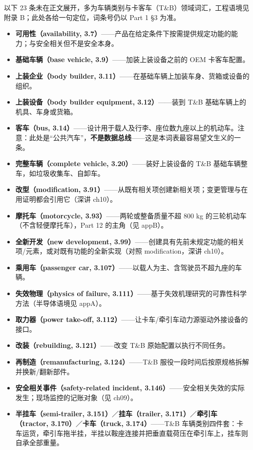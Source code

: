 以下 23 条未在正文展开，多为车辆类别与卡客车（T\&B）领域词汇，工程语境见附录 B；此处各给一句定位，词条号仍以 Part 1 §3 为准。

\begin{itemize}
\item \textbf{可用性（availability, 3.7）}——产品在给定条件下按需提供规定功能的能力；与安全相关但不是安全本身。
\item \textbf{基础车辆（base vehicle, 3.9）}——加装上装设备之前的 OEM 卡客车配置。
\item \textbf{上装企业（body builder, 3.11）}——在基础车辆上加装车身、货箱或设备的组织。
\item \textbf{上装设备（body builder equipment, 3.12）}——装到 T\&B 基础车辆上的机具、车身或货箱。
\item \textbf{客车（bus, 3.14）}——设计用于载人及行李、座位数九座以上的机动车。注意：此处是“公共汽车”，\textbf{不是数据总线}——这是本词表最容易望文生义的一条。
\item \textbf{完整车辆（complete vehicle, 3.20）}——装好上装设备的 T\&B 基础车辆整车，如垃圾收集车、自卸车。
\item \textbf{改型（modification, 3.91）}——从既有相关项创建新相关项；变更管理与在用证明都会引用它（深讲 ch10）。
\item \textbf{摩托车（motorcycle, 3.93）}——两轮或整备质量不超 800 kg 的三轮机动车（不含轻便摩托车），Part 12 的主角（见 appB）。
\item \textbf{全新开发（new development, 3.99）}——创建具有先前未规定功能的相关项/元素，或对既有功能的全新实现（对照 modification，深讲 ch10）。
\item \textbf{乘用车（passenger car, 3.107）}——以载人为主、含驾驶员不超九座的车辆。
\item \textbf{失效物理（physics of failure, 3.111）}——基于失效机理研究的可靠性科学方法（半导体语境见 appA）。
\item \textbf{取力器（power take-off, 3.112）}——让卡车/牵引车动力源驱动外接设备的接口。
\item \textbf{改装（rebuilding, 3.121）}——改变 T\&B 原始配置以执行不同任务。
\item \textbf{再制造（remanufacturing, 3.124）}——T\&B 服役一段时间后按原规格拆解并换新/翻新部件。
\item \textbf{安全相关事件（safety-related incident, 3.146）}——安全相关失效的实际发生；现场监控的记账对象（见 ch09）。
\item \textbf{半挂车（semi-trailer, 3.151）}／\textbf{挂车（trailer, 3.171）}／\textbf{牵引车（tractor, 3.170）}／\textbf{卡车（truck, 3.174）}——T\&B 车辆类别四件套：卡车运货，牵引车拖半挂，半挂以鞍座连接并把垂直载荷压在牵引车上，挂车则自承全部重量。

\end{itemize}
